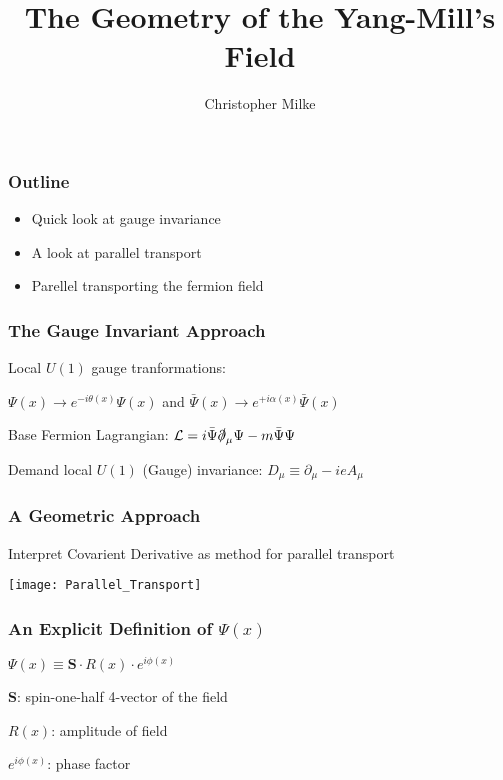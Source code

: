 \documentclass[12pt]{beamer}
\begin{document}
\title{The Geometry of the Yang-Mill's Field}
\author{Christopher Milke}

\frame{\titlepage}

\begin{frame}
\frametitle{Outline}
        \begin{itemize}
                \item Quick look at gauge invariance \vfill
                \item A look at parallel transport \vfill
                \item Parellel transporting the fermion field \vfill
        \end{itemize}
\end{frame}

\begin{frame}
\frametitle{The Gauge Invariant Approach}
        Local $U(1)$ gauge tranformations: 
        \vfill

        $ \Psi(x) \rightarrow e^{-i \theta(x)} \Psi(x) $ and $ \bar\Psi(x) \rightarrow e^{+i \alpha(x)} \bar\Psi(x) $
        \vfill

        Base Fermion Lagrangian:
        $ \mathcal{L} =  i \bar{\Psi} \slashed\partial_\mu \Psi - m \bar{\Psi} \Psi   $
        \vfill

        Demand local $U(1)$ (Gauge) invariance: 
        $ D_\mu \equiv \partial_\mu - i e A_\mu $
        \vfill
\end{frame}

\begin{frame}
\frametitle{A Geometric Approach}
        Interpret Covarient Derivative as method for parallel transport
        
        \begin{center}
        \texttt{[image: Parallel\_Transport]}
        \end{center}

\end{frame}

\begin{frame}
\frametitle{An Explicit Definition of $\Psi(x)$}
        $\Psi(x) \equiv \mathbf{S} \cdot R(x) \cdot e^{i \phi(x)}$ \vfill

        $\mathbf{S}$: spin-one-half 4-vector of the field \vfill

        $R(x)$: amplitude of field \vfill
        
        $e^{i \phi(x)}$: phase factor \vfill
\end{frame}
\end{document}
